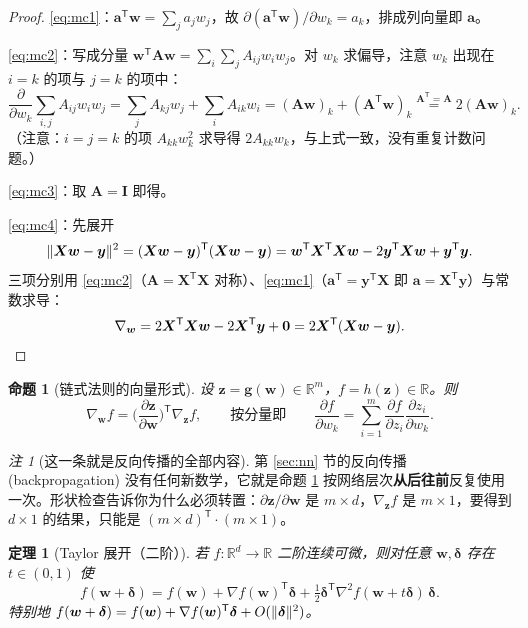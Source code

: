\documentclass[UTF8,a4paper,11pt]{ctexart}
\theoremstyle{definition}
\theoremstyle{plain}
\newtheorem{theorem}[definition]{定理}
\newtheorem{proposition}[definition]{命题}
\theoremstyle{remark}
\newtheorem{remark}[definition]{注}
\DeclarePairedDelimiter{\norm}{\lVert}{\rVert}
\newcommand{\R}{\mathbb{R}}
\newcommand{\T}{^{\mathsf{T}}}
\newcommand{\eng}[1]{\textup{(#1)}}
\begin{document}
\begin{proof}
\eqref{eq:mc1}：$\bm{a}\T\bm{w}=\sum_j a_jw_j$，故 $\partial(\bm{a}\T\bm{w})/\partial w_k=a_k$，排成列向量即 $\bm{a}$。

\eqref{eq:mc2}：写成分量 $\bm{w}\T\bm{A}\bm{w}=\sum_{i}\sum_{j}A_{ij}w_iw_j$。对 $w_k$ 求偏导，注意 $w_k$ 出现在 $i=k$ 的项与 $j=k$ 的项中：
\[
  \frac{\partial}{\partial w_k}\sum_{i,j}A_{ij}w_iw_j
  =\sum_{j}A_{kj}w_j+\sum_{i}A_{ik}w_i
  =(\bm{A}\bm{w})_k+(\bm{A}\T\bm{w})_k
  \overset{\bm{A}\T=\bm{A}}{=}2(\bm{A}\bm{w})_k .
\]
（注意：$i=j=k$ 的项 $A_{kk}w_k^2$ 求导得 $2A_{kk}w_k$，与上式一致，没有重复计数问题。）

\eqref{eq:mc3}：取 $\bm{A}=\bm{I}$ 即得。

\eqref{eq:mc4}：先展开
\[
  \norm{\bm{X}\bm{w}-\bm{y}}^2=(\bm{X}\bm{w}-\bm{y})\T(\bm{X}\bm{w}-\bm{y})
  =\bm{w}\T\bm{X}\T\bm{X}\bm{w}-2\bm{y}\T\bm{X}\bm{w}+\bm{y}\T\bm{y}.
\]
三项分别用 \eqref{eq:mc2}（$\bm{A}=\bm{X}\T\bm{X}$ 对称）、\eqref{eq:mc1}（$\bm{a}\T=\bm{y}\T\bm{X}$ 即 $\bm{a}=\bm{X}\T\bm{y}$）与常数求导：
\[
  \nabla_{\bm{w}}=2\bm{X}\T\bm{X}\bm{w}-2\bm{X}\T\bm{y}+\bm{0}=2\bm{X}\T(\bm{X}\bm{w}-\bm{y}).\qedhere
\]
\end{proof}

\begin{proposition}[链式法则的向量形式]\label{prop:chain}
设 $\bm{z}=\bm{g}(\bm{w})\in\R^m$，$f=h(\bm{z})\in\R$。则
\[
  \nabla_{\bm{w}}f=\Big(\frac{\partial\bm{z}}{\partial\bm{w}}\Big)^{\!\mathsf{T}}\nabla_{\bm{z}}f,
  \qquad\text{按分量即}\qquad
  \frac{\partial f}{\partial w_k}=\sum_{i=1}^{m}\frac{\partial f}{\partial z_i}\frac{\partial z_i}{\partial w_k}.
\]
\end{proposition}

\begin{remark}[这一条就是反向传播的全部内容]
第 \ref{sec:nn} 节的反向传播 \eng{backpropagation} 没有任何新数学，它就是命题 \ref{prop:chain} 按网络层次\textbf{从后往前}反复使用一次。形状检查告诉你为什么必须转置：$\partial\bm{z}/\partial\bm{w}$ 是 $m\times d$，$\nabla_{\bm{z}}f$ 是 $m\times1$，要得到 $d\times1$ 的结果，只能是 $(m\times d)\T\cdot(m\times1)$。
\end{remark}

\begin{theorem}[Taylor 展开（二阶）]\label{thm:taylor}
若 $f:\R^d\to\R$ 二阶连续可微，则对任意 $\bm{w},\bm{\delta}$ 存在 $t\in(0,1)$ 使
\[
  f(\bm{w}+\bm{\delta})=f(\bm{w})+\nabla f(\bm{w})\T\bm{\delta}
  +\tfrac12\bm{\delta}\T\nabla^2f(\bm{w}+t\bm{\delta})\,\bm{\delta}.
\]
特别地 $f(\bm{w}+\bm{\delta})=f(\bm{w})+\nabla f(\bm{w})\T\bm{\delta}+O(\norm{\bm{\delta}}^2)$。
\end{theorem}
\end{document}
